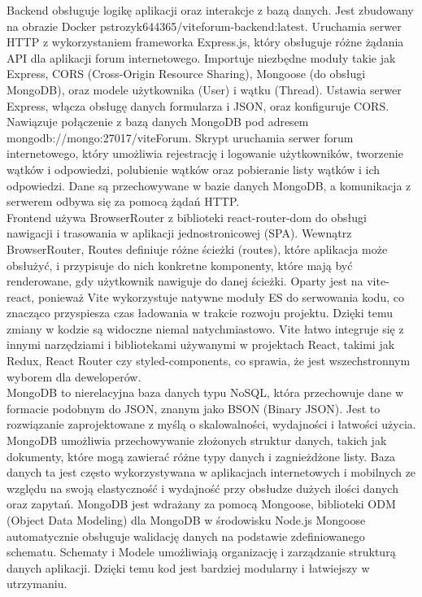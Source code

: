 \documentclass[12pt,a4paper]{article}
\begin{document}
Backend obsługuje logikę aplikacji oraz interakcje z bazą danych. Jest zbudowany na obrazie Docker pstrozyk644365/viteforum-backend:latest. Uruchamia serwer HTTP z wykorzystaniem frameworka Express.js, który obsługuje różne żądania API dla aplikacji forum internetowego.
Importuje niezbędne moduły takie jak Express, CORS (Cross-Origin Resource Sharing), Mongoose (do obsługi MongoDB), oraz modele użytkownika (User) i wątku (Thread).
Ustawia serwer Express, włącza obsługę danych formularza i JSON, oraz konfiguruje CORS.
Nawiązuje połączenie z bazą danych MongoDB pod adresem mongodb://mongo:27017/viteForum.
Skrypt uruchamia serwer forum internetowego, który umożliwia rejestrację i logowanie użytkowników, tworzenie wątków i odpowiedzi, polubienie wątków oraz pobieranie listy wątków i ich odpowiedzi. Dane są przechowywane w bazie danych MongoDB, a komunikacja z serwerem odbywa się za pomocą żądań HTTP.
\newline
\\
Frontend używa BrowserRouter z biblioteki react-router-dom do obsługi nawigacji i trasowania w aplikacji jednostronicowej (SPA). Wewnątrz BrowserRouter, Routes definiuje różne ścieżki (routes), które aplikacja może obsłużyć, i przypisuje do nich konkretne komponenty, które mają być renderowane, gdy użytkownik nawiguje do danej ścieżki. Oparty jest na vite-react, ponieważ Vite wykorzystuje natywne moduły ES do serwowania kodu, co znacząco przyspiesza czas ładowania w trakcie rozwoju projektu. Dzięki temu zmiany w kodzie są widoczne niemal natychmiastowo. Vite łatwo integruje się z innymi narzędziami i bibliotekami używanymi w projektach React, takimi jak Redux, React Router czy styled-components, co sprawia, że jest wszechstronnym wyborem dla deweloperów.
\newline
\\
MongoDB to nierelacyjna baza danych typu NoSQL, która przechowuje dane w formacie podobnym do JSON, znanym jako BSON (Binary JSON). Jest to rozwiązanie zaprojektowane z myślą o skalowalności, wydajności i łatwości użycia. MongoDB umożliwia przechowywanie złożonych struktur danych, takich jak dokumenty, które mogą zawierać różne typy danych i zagnieżdżone listy. Baza danych ta jest często wykorzystywana w aplikacjach internetowych i mobilnych ze względu na swoją elastyczność i wydajność przy obsłudze dużych ilości danych oraz zapytań. \newline
MongoDB jest wdrażany za pomocą Mongoose, biblioteki ODM (Object Data Modeling) dla MongoDB w środowisku Node.js Mongoose automatycznie obsługuje walidację danych na podstawie zdefiniowanego schematu. Schematy i Modele umożliwiają organizację i zarządzanie strukturą danych aplikacji. Dzięki temu kod jest bardziej modularny i łatwiejszy w utrzymaniu.
\end{document}
